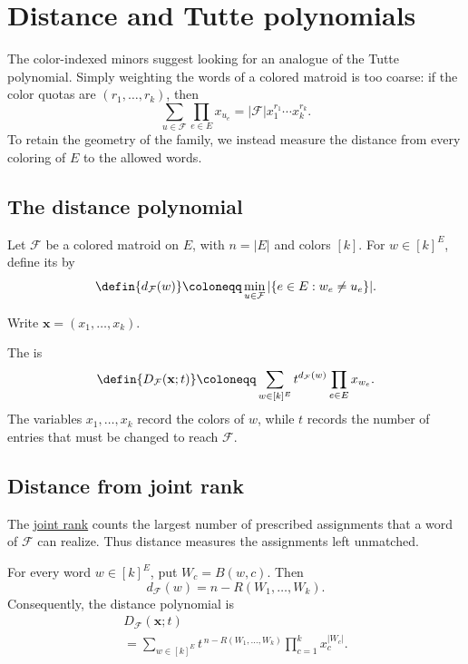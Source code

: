 
\section[distanceAndTutte]{Distance and Tutte polynomials}

The color-indexed minors suggest looking for an analogue of the Tutte
polynomial. Simply weighting the words of a colored matroid is too coarse:
if the color quotas are $(r_1,\dotsc,r_k)$, then
\[
 \sum_{u\in\mathcal F}\prod_{e\in E}x_{u_e}
 =|\mathcal F|x_1^{r_1}\dotsm x_k^{r_k}.
\]
To retain the geometry of the family, we instead measure the distance from
every coloring of $E$ to the allowed words.

\subsection[distancePolynomial]{The distance polynomial}

Let $\mathcal F$ be a colored matroid on $E$, with $n=|E|$ and colors $[k]$. For
$w\in[k]^E$, define its  by
\[
 \defin{d_{\mathcal F}(w)}
 \coloneqq
 \min_{u\in\mathcal F}|\{e\in E:w_e\ne u_e\}|.
\]

Write $\mathbf x=(x_1,\dotsc,x_k)$.

\begin{definition}
The  is
\[
 \defin{D_{\mathcal F}(\mathbf x;t)}
 \coloneqq
 \sum_{w\in[k]^E}
 t^{d_{\mathcal F}(w)}\prod_{e\in E}x_{w_e}.
\]
The variables $x_1,\dotsc,x_k$ record the colors of $w$, while $t$ records
the number of entries that must be changed to reach $\mathcal F$.
\end{definition}

\subsection[rankDistance]{Distance from joint rank}

The \href{rank-flats.htm#jointRank}{joint rank} counts the largest number
of prescribed assignments that a word of $\mathcal F$ can realize.
Thus distance measures the assignments left unmatched.

\begin{proposition}
For every word $w\in[k]^E$, put $W_c=B(w,c)$. Then
\[
 d_{\mathcal F}(w)=n-R(W_1,\dotsc,W_k).
\]
Consequently, the distance polynomial is
\[
 \begin{gathered}
 D_{\mathcal F}(\mathbf x;t)\\
 =\sum_{w\in[k]^E}t^{\,n-R(W_1,\dotsc,W_k)}
 \prod_{c=1}^k x_c^{|W_c|}.
 \end{gathered}
\]
\end{proposition}


